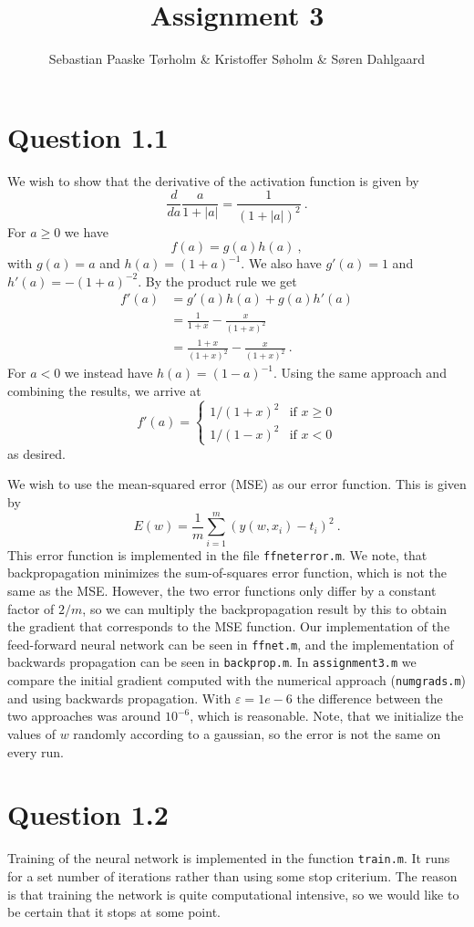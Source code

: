 \documentclass[11pt,a4paper]{article}
\title{Assignment 3}
\author{Sebastian Paaske Tørholm \& Kristoffer Søholm \& Søren Dahlgaard}
\newcommand{\mono}[1]{\texttt{#1}}
\begin{document}
\maketitle

\section{Question 1.1}

We wish to show that the derivative of the activation function is given by
\[
    \frac{d}{da} \frac{a}{1+|a|} = \frac{1}{(1+|a|)^2}\ .
\]
For $a\ge 0$ we have
\[
    f(a) = g(a)h(a)\ ,
\]
with $g(a) = a$ and $h(a) = (1+a)^{-1}$. We also have $g'(a) = 1$ and
$h'(a) = -(1+a)^{-2}$. By the product rule we get
\begin{align}
    f'(a) &= g'(a)h(a) + g(a)h'(a) \\
          &= \frac{1}{1+x} - \frac{x}{(1+x)^2} \\
          &= \frac{1+x}{(1+x)^2} - \frac{x}{(1+x)^2}\ .
\end{align}
For $a < 0$ we instead have $h(a) = (1-a)^{-1}$. Using the same approach and
combining the results, we arrive at
\[
    f'(a) =
    \begin{cases}
        1/(1+x)^2 & \text{if $x\ge 0$} \\
        1/(1-x)^2 & \text{if $x < 0$}
    \end{cases}
\]
as desired.

We wish to use the mean-squared error (MSE) as our error function. This is
given by
\[
    E(w) = \frac{1}{m} \sum_{i=1}^m (y(w, x_i) - t_i)^2\ .
\]
This error function is implemented in the file \mono{ffneterror.m}. We note,
that backpropagation minimizes the sum-of-squares error function, which is
not the same as the MSE. However, the two error functions only differ by a
constant factor of $2/m$, so we can multiply the backpropagation result by
this to obtain the gradient that corresponds to the MSE function. Our
implementation of the feed-forward neural network can be seen in
\mono{ffnet.m}, and the implementation of backwards propagation can be seen
in \mono{backprop.m}. In \mono{assignment3.m} we compare the initial gradient
computed with the numerical approach (\mono{numgrads.m}) and using backwards
propagation. With $\varepsilon = 1e-6$ the difference between the two
approaches was around $10^{-6}$, which is reasonable. Note, that we initialize
the values of $w$ randomly according to a gaussian, so the error is not the
same on every run.


\section{Question 1.2}
Training of the neural network is implemented in the function \mono{train.m}.
It runs for a set number of iterations rather than using some stop criterium.
The reason is that training the network is quite computational intensive, so
we would like to be certain that it stops at some point.
\end{document}
